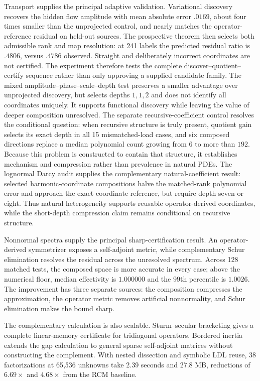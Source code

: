 \documentclass[11pt]{article}
\numberwithin{algorithm}{section}
\theoremstyle{definition}\newtheorem{definition}[theorem]{Definition}
\theoremstyle{remark}\newtheorem{remark}[theorem]{Remark}
\begin{document}
Transport supplies the principal adaptive validation.  Variational discovery
recovers the hidden flow amplitude with mean absolute error $.0169$, about
four times smaller than the unprojected control, and nearly matches the
operator-reference residual on held-out sources.  The prospective theorem
then selects both admissible rank and map resolution: at 241 labels the
predicted residual ratio is $.4806$, versus $.4786$ observed.  Straight and
deliberately incorrect coordinates are not certified.  The experiment
therefore tests the complete discover--quotient--certify sequence rather than
only approving a supplied candidate family.
The mixed amplitude--phase--scale--depth test preserves a smaller advantage
over unprojected discovery, but selects depths $1,1,2$ and does not identify
all coordinates uniquely.  It supports functional discovery while leaving
the value of deeper composition unresolved.
The separate recursive-coefficient control resolves the conditional question:
when recursive structure is truly present, quotient gain selects its exact
depth in all 15 mismatched-load cases, and six composed directions replace a
median polynomial count growing from $6$ to more than $192$.  Because this
problem is constructed to contain that structure, it establishes mechanism
and compression rather than prevalence in natural PDEs.
The lognormal Darcy audit supplies the complementary natural-coefficient
result: selected harmonic-coordinate compositions halve the matched-rank
polynomial error and approach the exact coordinate reference, but require
depth seven or eight.  Thus natural heterogeneity supports reusable
operator-derived coordinates, while the short-depth compression claim remains
conditional on recursive structure.

Nonnormal spectra supply the principal sharp-certification result.  An
operator-derived symmetrizer exposes a self-adjoint metric, while complementary
Schur elimination resolves the residual across the unresolved spectrum.
Across 128 matched tests, the composed space is more accurate in every case;
above the numerical floor, median effectivity is $1.000000$ and the 99th
percentile is $1.0026$.  The improvement has three separate sources: the
composition compresses the approximation, the operator metric removes
artificial nonnormality, and Schur elimination makes the bound sharp.

The complementary calculation is also scalable.  Sturm--secular bracketing
gives a complete linear-memory certificate for tridiagonal operators.
Bordered inertia extends the gap calculation to general sparse self-adjoint
matrices without constructing the complement.  With nested dissection and
symbolic LDL reuse, 38 factorizations at 65,536 unknowns take 2.39 seconds and
27.8 MB, reductions of $6.69\times$ and $4.68\times$ from the RCM baseline.
\end{document}
